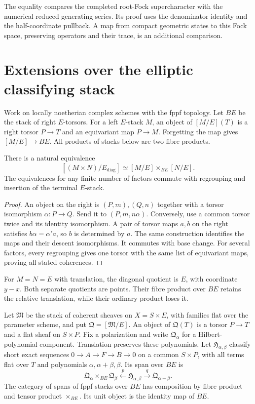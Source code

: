 The equality compares the completed root-Fock supercharacter with the
numerical reduced generating series. Its proof uses the denominator
identity and the half-coordinate pullback. A map from compact geometric
states to this Fock space, preserving operators and their trace,
is an additional comparison.

\chapter{Extensions over the elliptic classifying stack}
Work on locally noetherian complex schemes with the fppf topology.
Let \(BE\) be the stack of right \(E\)-torsors. For a left
\(E\)-stack \(M\), an object of \([M/E](T)\) is a right
torsor \(P\to T\) and an equivariant map \(P\to M\).
Forgetting the map gives \([M/E]\to BE\). All products of
stacks below are two-fibre products.

\begin{proposition}
\label{igusa:platonic-common-torsor}
There is a natural equivalence
\[
 [(M\times N)/E_{\mathrm{diag}}]
 \simeq[M/E]\times_{BE}[N/E].
\]
The equivalences for any finite number of factors commute with
regrouping and insertion of the terminal \(E\)-stack.
\end{proposition}
\begin{proof}
An object on the right is \((P,m),(Q,n)\) together with a
torsor isomorphism \(\alpha:P\to Q\). Send it to
\((P,m,n\alpha)\). Conversely, use a common torsor twice
and its identity isomorphism. A pair of torsor maps \(a,b\)
on the right satisfies \(b\alpha=\alpha'a\), so \(b\)
is determined by \(a\). The same construction identifies the
maps and their descent isomorphisms. It commutes with base change.
For several factors, every regrouping gives one torsor with the
same list of equivariant maps, proving all stated coherences.
\end{proof}

For \(M=N=E\) with translation, the diagonal quotient is
\(E\), with coordinate \(y-x\). Both separate quotients
are points. Their fibre product over \(BE\) retains the
relative translation, while their ordinary product loses it.

Let \(\mathfrak M\) be the stack of coherent sheaves on
\(X=S\times E\), with families flat over the parameter
scheme, and put \(\mathfrak Q=[\mathfrak M/E]\).
An object of \(\mathfrak Q(T)\) is a torsor \(P\to T\)
and a flat sheaf on \(S\times P\). Fix a polarization and
write \(\mathfrak Q_\alpha\) for a Hilbert-polynomial component.
Translation preserves these polynomials. Let
\(\mathfrak H_{\alpha,\beta}\) classify short exact sequences
\(0\to A\to F\to B\to0\) on a common \(S\times P\),
with all terms flat over \(T\) and polynomials
\(\alpha,\alpha+\beta,\beta\). Its span over \(BE\) is
\[
 \mathfrak Q_\alpha\times_{BE}\mathfrak Q_\beta
 \xleftarrow{p}\mathfrak H_{\alpha,\beta}
 \xrightarrow{q}\mathfrak Q_{\alpha+\beta}.
\]
The category of spans of fppf stacks over \(BE\) has composition
by fibre product and tensor product \(\times_{BE}\). Its unit
object is the identity map of \(BE\).

